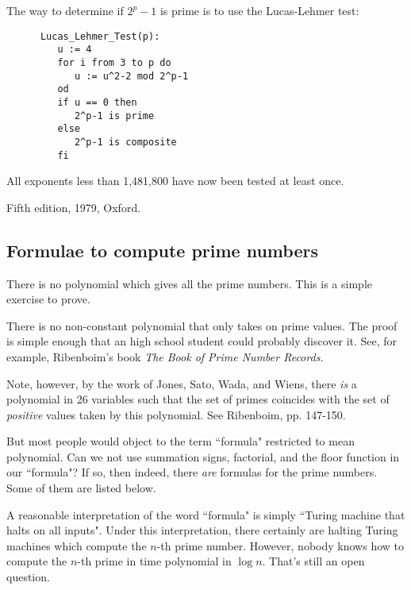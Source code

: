 \bigskip
\bigskip

    The way to determine if $2^p-1$ is prime is to use the Lucas-Lehmer 
    test:

\begin{verbatim}
      Lucas_Lehmer_Test(p):
         u := 4
         for i from 3 to p do
            u := u^2-2 mod 2^p-1
         od
         if u == 0 then
            2^p-1 is prime
         else
            2^p-1 is composite
         fi
\end{verbatim}

  All exponents less than 1,481,800 have now been tested at least once.


\Ref

{Fifth edition, 1979, Oxford.}
 


\subsection{Formulae to compute prime numbers}


     There is no polynomial which gives all the prime numbers. This is
     a simple exercise to prove.

\noindent There is no non-constant polynomial that only takes on prime values.
      The proof is simple enough that an high school student could probably
      discover it.  See, for example, Ribenboim's book {\it The Book of Prime
      Number Records.}

     Note, however, by the work of Jones, Sato, Wada, and Wiens, there 
     {\it is} a
     polynomial in 26 variables such that the set of primes coincides with
     the set of {\it positive} values taken by this polynomial.  See Ribenboim,
     pp. 147-150.

     But most people would object to the term ``formula" restricted to mean
     polynomial.  Can we not use summation signs, factorial, and the floor
     function in our ``formula"?  If so, then indeed, there {\it are} formulas
     for the prime numbers.  Some of them are listed below.

     A reasonable interpretation of
     the word ``formula" is simply ``Turing machine that halts on all inputs".
     Under this interpretation, there certainly are halting Turing machines
     which compute the $n$-th prime number.  However, nobody knows how to
     compute the $n$-th prime in time polynomial in $\log n$.  That's still
     an open question.

